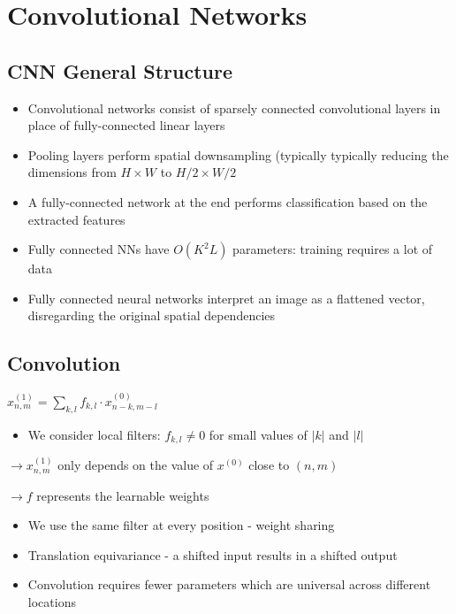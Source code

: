 \section*{Convolutional Networks}
\subsection*{CNN General Structure}


\begin{itemize}
  \item Convolutional networks consist of sparsely connected convolutional layers in place of fully-connected linear layers
  \item Pooling layers perform spatial downsampling (typically typically reducing the dimensions from $H \times W$ to $H / 2 \times W / 2$
  \item A fully-connected network at the end performs classification based on the extracted features
\end{itemize}


\begin{itemize}
  \item Fully connected NNs have $O\left(K^{2} L\right)$ parameters: training requires a lot of data
  \item Fully connected neural networks interpret an image as a flattened vector, disregarding the original spatial dependencies
\end{itemize}


\subsection*{Convolution}
$
x_{n, m}^{(1)}=\sum_{k, l} f_{k, l} \cdot x_{n-k, m-l}^{(0)}
$

\begin{itemize}
  \item We consider local filters: $f_{k, l} \neq 0$ for small values of $|k|$ and $|l|$
\end{itemize}

$\rightarrow x_{n, m}^{(1)}$ only depends on the value of $x^{(0)}$ close to $(n, m)$

$\rightarrow f$ represents the learnable weights

\begin{itemize}
  \item We use the same filter at every position - weight sharing

  \item Translation equivariance - a shifted input results in a shifted output
  \item  Convolution requires fewer parameters which are universal across different locations

\end{itemize}


